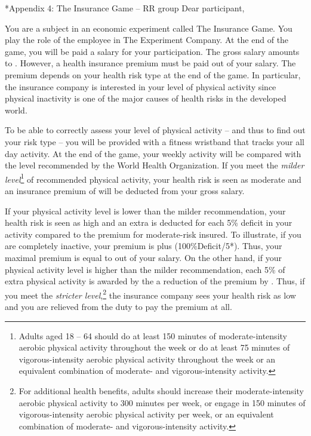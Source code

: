 \documentclass[12pt,english]{article}%
\makeatletter
\renewcommand{\subsection}{\@startsection{subsection}{2}{0mm}{-0.1\baselineskip}{0.5\baselineskip}{\normalfont\bf\flushleft}}
\makeatother
\begin{document}
\subsection*{Appendix 4: The Insurance Game -- RR group}
Dear participant,

You are a subject in an economic experiment called The Insurance Game. You play the role of the employee in The Experiment Company. At the end of the game, you will be paid a salary for your participation. The gross salary amounts to . However, a health insurance premium must be paid out of your salary. The premium depends on your health risk type at the end of the game. In particular, the insurance company is interested in your level of physical activity since physical inactivity is one of the major causes of health risks in the developed world.

To be able to correctly assess your level of physical activity -- and thus to find out your risk type -- you will be provided with a fitness wristband that tracks your all day activity. At the end of the game, your weekly activity will be compared with the level recommended by the World Health Organization. If you meet the \textit{milder level}\footnote{Adults aged 18 -- 64 should do at least 150 minutes of moderate-intensity aerobic physical activity throughout the week or do at least 75 minutes of vigorous-intensity aerobic physical activity throughout the week or an equivalent combination of moderate- and vigorous-intensity activity.} of recommended physical activity, your health risk is seen as moderate and an insurance premium of  will be deducted from your gross salary.

If your physical activity level is lower than the milder recommendation, your health risk is seen as high and an extra  is deducted for each 5\% deficit in your activity compared to the premium for moderate-risk insured. To illustrate, if you are completely inactive, your premium is  plus  (100\%Deficit/5*). Thus, your maximal premium is equal to  out of your  salary. On the other hand, if your physical activity level is higher than the milder recommendation, each 5\% of extra physical activity is awarded by the a reduction of the premium by . Thus, if you meet the \textit{stricter level},\footnote{For additional health benefits, adults should increase their moderate-intensity aerobic physical activity to 300 minutes per week, or engage in 150 minutes of vigorous-intensity aerobic physical activity per week, or an equivalent combination of moderate- and vigorous-intensity activity.} the insurance company sees your health risk as low and you are relieved from the duty to pay the premium at all.
\end{document}
